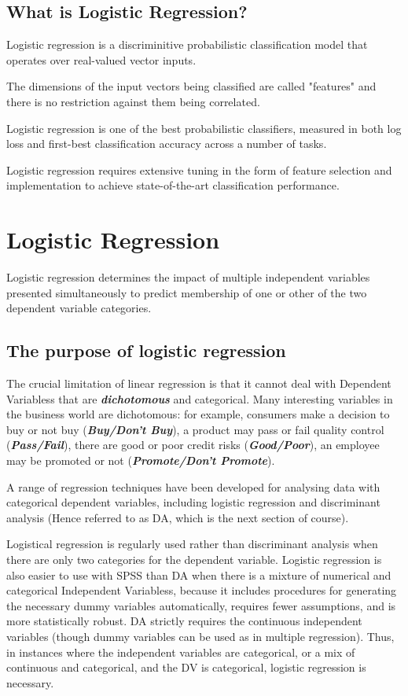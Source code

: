 ﻿\documentclass[a4paper,12pt]{article}
\begin{document}
\tableofcontents
\subsection*{What is Logistic Regression?}
Logistic regression is a discriminitive probabilistic classification model that operates over real-valued vector inputs. 

The dimensions of the input vectors being classified are called "features" and there is no restriction against them being correlated. 

Logistic regression is one of the best probabilistic classifiers, measured in both log loss and first-best classification accuracy across a number of tasks.

Logistic regression requires extensive tuning in the form of feature selection and implementation to achieve state-of-the-art classification performance.

\section{Logistic Regression}
Logistic regression determines the impact of multiple independent variables
presented simultaneously to predict membership of one or other of the two
dependent variable categories.

\subsection{The purpose of logistic regression}
The crucial limitation of linear regression is that it cannot deal with Dependent Variabless that are \textbf{\textit{dichotomous}} and categorical. Many interesting variables in the business world are dichotomous: for
example, consumers make a decision to buy or not buy (\textit{\textbf{Buy/Don't Buy}}), a product may pass or fail quality control (\textit{\textbf{Pass/Fail}}), there are good or poor credit risks (\textit{\textbf{Good/Poor}}), an employee may be promoted or not (\textit{\textbf{Promote/Don't Promote}}).


A range of regression techniques have been developed for analysing data with categorical dependent
variables, including logistic regression and discriminant analysis (Hence referred to as DA, which is the next section of course).

Logistical regression is regularly used rather than discriminant analysis when there are only two categories
for the dependent variable. Logistic regression is also easier to use with SPSS than DA when
there is a mixture of numerical and categorical Independent Variabless, because it includes procedures for
generating the necessary dummy variables automatically, requires fewer assumptions, and
is more statistically robust. DA strictly requires the continuous independent variables  (though dummy variables can be used as in multiple regression). Thus, in instances where
the independent variables are categorical, or a mix of continuous and categorical, and the
DV is categorical, logistic regression is necessary.
\end{document}
